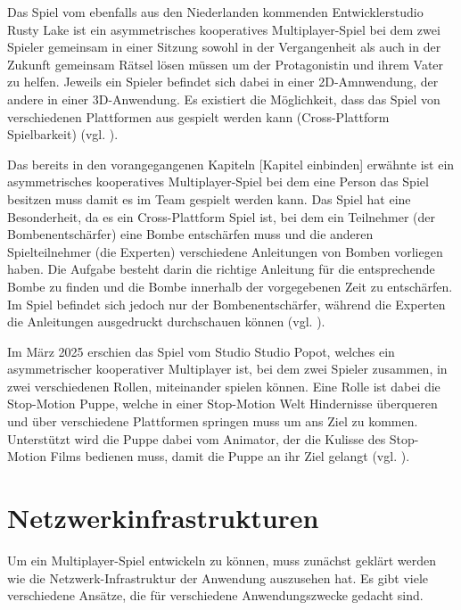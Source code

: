 Das Spiel  vom ebenfalls aus den Niederlanden kommenden Entwicklerstudio Rusty Lake ist ein asymmetrisches kooperatives Multiplayer-Spiel bei dem zwei Spieler gemeinsam in einer Sitzung sowohl in der Vergangenheit als auch in der Zukunft gemeinsam Rätsel lösen müssen um der Protagonistin und ihrem Vater zu helfen. Jeweils ein Spieler befindet sich dabei in einer 2D-Amnwendung, der andere in einer 3D-Anwendung. Es existiert die Möglichkeit, dass das Spiel von verschiedenen Plattformen aus gespielt werden kann (Cross-Plattform Spielbarkeit) (vgl. \cite{noauthor_past_nodate}). 

Das bereits in den vorangegangenen Kapiteln [Kapitel einbinden] erwähnte  ist ein asymmetrisches kooperatives Multiplayer-Spiel bei dem eine Person das Spiel besitzen muss damit es im Team gespielt werden kann. Das Spiel hat eine Besonderheit, da es ein Cross-Plattform Spiel ist, bei dem ein Teilnehmer (der Bombenentschärfer) eine Bombe entschärfen muss und die anderen Spielteilnehmer (die Experten) verschiedene Anleitungen von Bomben vorliegen haben. Die Aufgabe besteht darin die richtige Anleitung für die entsprechende Bombe zu finden und die Bombe innerhalb der vorgegebenen Zeit zu entschärfen. Im Spiel befindet sich jedoch nur der Bombenentschärfer, während die Experten die Anleitungen ausgedruckt durchschauen können (vgl. \cite{noauthor_keep_nodate}).

Im März 2025 erschien das Spiel  vom Studio Studio Popot, welches ein asymmetrischer kooperativer Multiplayer ist, bei dem zwei Spieler zusammen, in zwei verschiedenen Rollen, miteinander spielen können. Eine Rolle ist dabei die Stop-Motion Puppe, welche in einer Stop-Motion Welt Hindernisse überqueren und über verschiedene Plattformen springen muss um ans Ziel zu kommen. Unterstützt wird die Puppe dabei vom Animator, der die Kulisse des Stop-Motion Films bedienen muss, damit die Puppe an ihr Ziel gelangt (vgl. \cite{noauthor_myrmidon_2024}).

\section{Netzwerkinfrastrukturen}
Um ein Multiplayer-Spiel entwickeln zu können, muss zunächst geklärt werden wie die Netzwerk-Infrastruktur der Anwendung auszusehen hat. Es gibt viele verschiedene Ansätze, die für verschiedene Anwendungszwecke gedacht sind.

